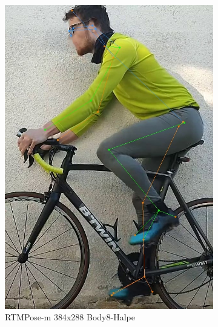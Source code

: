 \begin{figure}[htbp]
\begin{subfigure}[b]{\imgwidth}
        \includegraphics[width=\smallimgwidth]{obrazky-figures/rtmpose-m_8xb512-700e_body8-halpe26-384x288_zlute_196_crop.jpg}
        \caption{RTMPose-m 384x288 Body8-Halpe}
    \end{subfigure}
    \hfill
    \par\bigskip

    \begin{subfigure}[b]{\imgwidth}
        \centering


\end{subfigure}
\end{figure}
